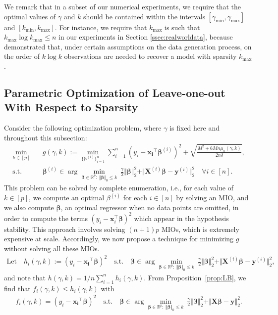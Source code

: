 \documentclass[opre,nonblindrev]{informs3} %
\begin{document}
We remark that in a subset of our numerical experiments, we require that the optimal values of $\gamma$ and $k$ should be contained within the intervals $[\gamma_{\min}, \gamma_{\max}]$ and $[k_{\min}, k_{\max}]$. For instance, we require that $k_{\max}$ is such that $k_{\max}\log k_{\max} \leq n$ in our experiments in Section \ref{ssec:realworldata}, because \citet[Theorem 2.5]{gamarnik2022sparse} demonstrated that, under certain assumptions on the data generation process, on the order of $k\log k$ observations are needed to recover a model with sparsity $k_{\max}$.


\subsection{Parametric Optimization of Leave-one-out With Respect to Sparsity}\label{ssec:parametric}

Consider the following optimization problem, where $\gamma$ is fixed here and throughout this subsection:
\begin{equation}\label{eq:paramK}
\begin{aligned}
\min_{k\in [p]} \quad & g({\gamma}, k):=\min_{\{\bm{\beta}^{(i)}\}_{i=1}^n} \sum_{i=1}^n (y_i -\bm{x_i}^\top \bm{\beta}^{(i)})^2+\sqrt{\frac{M^2+6 M n \mu_h({\gamma}, k)}{2 n \delta}},\\
\text{s.t.} \quad  & \bm{\beta}^{(i)} \in \arg\min_{\bm{\beta} \in \mathbb{R}^p: \ \Vert\bm{\beta}\Vert_0\leq k} \ \frac{\gamma}{2}\Vert \bm{\beta}\Vert_2^2 +\Vert \bm{X}^{(i)}\bm{\beta}-\bm{y}^{(i)}\Vert_2^2\quad \forall i \in [n].
\end{aligned}
\end{equation}
This problem can be solved by complete enumeration, i.e., for each value of $k \in [p]$, we compute an optimal $\beta^{(i)}$ for each $i\in [n]$ by solving an MIO, and we also compute $\bm{\beta}$, an optimal regressor when no data points are omitted, in order to compute the terms $(y_i-\bm{x}_i^\top \bm{\beta})^2$ which appear in the hypothesis stability. This approach involves solving $(n+1)p$ MIOs, which is extremely expensive at scale. Accordingly, we now propose a technique for minimizing $g$ without solving all these MIOs. 
\begin{align}
\text{Let} \quad	h_i(\gamma, k):= (y_i -\bm{x_i}^\top \bm{\beta})^2\quad
	\text{s.t.} \quad  \bm{\beta} \in \arg\min_{\bm{\beta} \in \mathbb{R}^p: \ \Vert\bm{\beta}\Vert_0\leq k} \ \frac{\gamma}{2}\Vert \bm{\beta}\Vert_2^2 +\Vert \bm{X}^{(i)}\bm{\beta}-\bm{y}^{(i)}\Vert_2^2,
\end{align}
and note that $h(\gamma, k)=1/n \sum_{i=1}^n h_i(\gamma, k)$. From Proposition~\ref{prop:LB}, we find that $f_i(\gamma, k)\leq h_i(\gamma, k)$ with 
\begin{align}
f_i(\gamma, k) = (y_i -\bm{x_i}^\top \bm{\beta})^2\quad
\text{s.t.} \quad  \bm{\beta} \in \arg\min_{\bm{\beta} \in \mathbb{R}^p: \ \Vert\bm{\beta}\Vert_0\leq k} \ \frac{\gamma}{2}\Vert \bm{\beta}\Vert_2^2 +\Vert \bm{X}\bm{\beta}-\bm{y}\Vert_2^2.
\end{align}
\end{document}
